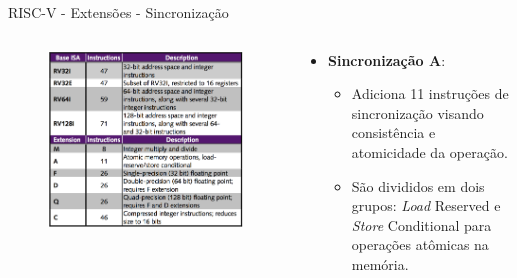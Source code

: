\documentclass[aspectratio=169]{beamer}
\begin{document}
\begin{frame}{RISC-V - Extensões - Sincronização}
	\begin{columns}
		\begin{column}{0.58\textwidth}
			\begin{figure}
				\centering
				\label{fig:bi2}
				\includegraphics[width=1\textwidth]{img/base-instruction.png}
			\end{figure}
		\end{column}
		\begin{column}{0.55\textwidth}

			\begin{itemize}
				\item \textbf{Sincronização A}:
				\begin{itemize}
					\item Adiciona 11 instruções de sincronização visando consistência e atomicidade da operação.
					\item São divididos em dois grupos: \textit{Load} Reserved e \textit{Store} Conditional para operações atômicas na memória.
				\end{itemize}

			\end{itemize}
		\end{column}
	\end{columns}
\end{frame}
\end{document}
